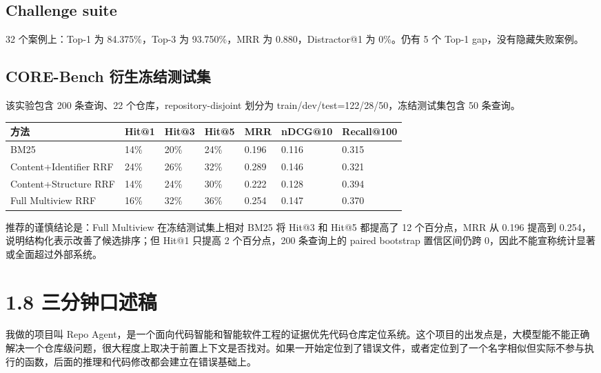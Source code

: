 \documentclass[UTF8,12pt,openany]{ctexbook}
\begin{document}
\subsection{Challenge suite}

32 个案例上：Top-1 为 84.375\%，Top-3 为 93.750\%，MRR 为 0.880，Distractor@1 为 0\%。仍有 5 个 Top-1 gap，没有隐藏失败案例。\par

\subsection{CORE-Bench 衍生冻结测试集}

该实验包含 200 条查询、22 个仓库，repository-disjoint 划分为 train/dev/test=122/28/50，冻结测试集包含 50 条查询。\par

\begin{center}
\small
\begin{longtable}{|p{}|p{}|p{}|p{}|p{}|p{}|p{}|}
\toprule
方法 & Hit@1 & Hit@3 & Hit@5 & MRR & nDCG@10 & Recall@100 \\
\midrule
BM25 & 14\% & 20\% & 24\% & 0.196 & 0.116 & 0.315 \\
Content+Identifier RRF & 24\% & 26\% & 32\% & 0.289 & 0.146 & 0.321 \\
Content+Structure RRF & 14\% & 24\% & 30\% & 0.222 & 0.128 & 0.394 \\
Full Multiview RRF & 16\% & 32\% & 36\% & 0.254 & 0.147 & 0.370 \\
\bottomrule
\end{longtable}
\end{center}

推荐的谨慎结论是：Full Multiview 在冻结测试集上相对 BM25 将 Hit@3 和 Hit@5 都提高了 12 个百分点，MRR 从 0.196 提高到 0.254，说明结构化表示改善了候选排序；但 Hit@1 只提高 2 个百分点，200 条查询上的 paired bootstrap 置信区间仍跨 0，因此不能宣称统计显著或全面超过外部系统。\par

\section{1.8 三分钟口述稿}

我做的项目叫 Repo Agent，是一个面向代码智能和智能软件工程的证据优先代码仓库定位系统。这个项目的出发点是，大模型能不能正确解决一个仓库级问题，很大程度上取决于前置上下文是否找对。如果一开始定位到了错误文件，或者定位到了一个名字相似但实际不参与执行的函数，后面的推理和代码修改都会建立在错误基础上。\par
\end{document}
